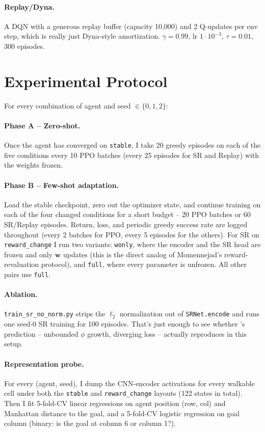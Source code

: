 \documentclass{article}
\begin{document}
\paragraph{Replay/Dyna.} A DQN with a generous replay buffer (capacity 10{,}000) and 2 Q-updates per env step, which is really just Dyna-style amortization. $\gamma{=}0.99$, lr $1\cdot10^{-3}$, $\tau{=}0.01$, 300 episodes.

\section{Experimental Protocol}
\label{sec:protocol}

For every combination of agent and seed $\in\{0,1,2\}$:

\paragraph{Phase A -- Zero-shot.} Once the agent has converged on \texttt{stable}, I take 20 greedy episodes on each of the five conditions every 10 PPO batches (every 25 episodes for SR and Replay) with the weights frozen.

\paragraph{Phase B -- Few-shot adaptation.} Load the stable checkpoint, zero out the optimizer state, and continue training on each of the four changed conditions for a short budget -- 20 PPO batches or 60 SR/Replay episodes. Return, loss, and periodic greedy success rate are logged throughout (every 2 batches for PPO, every 5 episodes for the others). For SR on \texttt{reward\_change} I run two variants: \texttt{wonly}, where the encoder and the SR head are frozen and only $\mathbf{w}$ updates (this is the direct analog of Momennejad's reward-revaluation protocol), and \texttt{full}, where every parameter is unfrozen. All other pairs use \texttt{full}.

\paragraph{Ablation.} \texttt{train\_sr\_no\_norm.py} strips the $\ell_2$ normalization out of \texttt{SRNet.encode} and runs one seed-0 SR training for 100 episodes. That's just enough to see whether \citet{lehnert2024sf}'s prediction -- unbounded $\phi$ growth, diverging loss -- actually reproduces in this setup.

\paragraph{Representation probe.} For every (agent, seed), I dump the CNN-encoder activations for every walkable cell under both the \texttt{stable} and \texttt{reward\_change} layouts (122 states in total). Then I fit 5-fold-CV linear regressions on agent position (row, col) and Manhattan distance to the goal, and a 5-fold-CV logistic regression on goal column (binary: is the goal at column 6 or column 1?).
\end{document}
